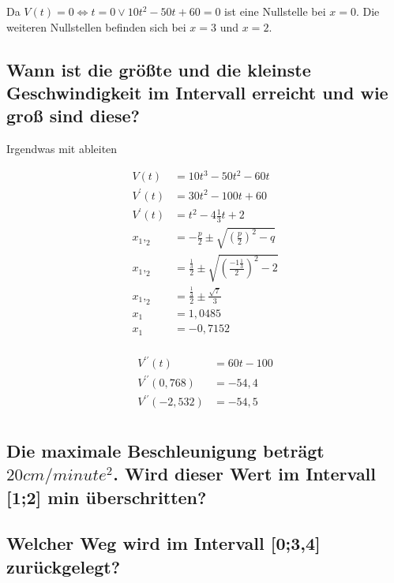 \documentclass[a4paper,11pt]{scrartcl}
\begin{document}
Da $V(t) = 0 \Leftrightarrow t = 0 \vee 10t^2 - 50t + 60 = 0$ ist eine
Nullstelle bei $x = 0$. Die weiteren Nullstellen befinden sich bei $x = 3$ und
$x = 2$.

\subsection{Wann ist die größte und die kleinste Geschwindigkeit im Intervall
erreicht und wie groß sind diese?}

\begin{outline}
  \1 Irgendwas mit ableiten
\end{outline}

\begin{align*}
  V(t) &= 10t^3 - 50t^2 - 60t                               \\
  V^\prime(t) &= 30t^2 - 100t + 60  \\
  V^\prime(t) &= t^2  - 4\frac{1}{3}t + 2  \\
  x_1,_2 &= -\frac{p}{2} \pm \sqrt{\left(\frac{p}{2}\right)^2 - q} \\
  x_1,_2 &= \frac{\frac{1}{3}}{2} \pm \sqrt{\left(\frac{-1\frac{1}{3}}{2}\right)^2 - 2} \\
  x_1,_2 &= \frac{\frac{1}{3}}{2} \pm \frac{{\sqrt{7}}}{3} \\
  x_1   &= 1,0485  \\
  x_1   &= -0,7152  \\
\end{align*}

\begin{align*}
  V^{\prime\prime}(t) &= 60t - 100  \\
  V^{\prime\prime}(0,768) &= -54,4  \\
  V^{\prime\prime}(-2,532) &= -54,5 \\
\end{align*}

\subsection{Die maximale Beschleunigung beträgt $20cm / minute^2$. Wird dieser
Wert im Intervall [1;2] min überschritten?}

\subsection{Welcher Weg wird im Intervall [0;3,4] zurückgelegt?}
\end{document}
